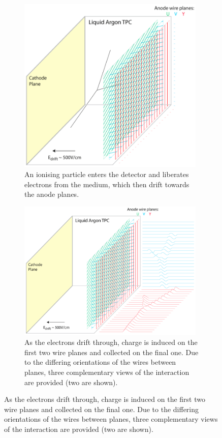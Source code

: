 \begin{figure}[p]
\begin{subfigure}[t]{0.48\linewidth}
    \includegraphics[width=0.98\textwidth]{LArTPCOperation2.png}
    \caption{An ionising particle enters the detector and liberates electrons from the medium, which then drift towards the anode planes.}
    \label{fig:LArTPCOperation2}
  \end{subfigure}
  \hfill
    \begin{subfigure}[t]{0.48\linewidth}
    \centering
    \includegraphics[width=0.98\textwidth]{LArTPCOperation3.png}
    \caption{As the electrons drift through, charge is induced on the first two wire planes and collected on the final one.  Due to the differing orientations of the wires between planes, three complementary views of the interaction are provided (two are shown).}

\end{subfigure}
\end{figure}
